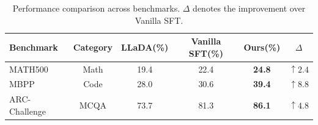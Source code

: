 \begin{table}[htbp]
\centering
\small
\caption{
Performance comparison across benchmarks. $\Delta$ denotes the improvement over Vanilla SFT.
}
\begin{tabular}{lccccc}
\toprule
Benchmark & Category & LLaDA(\%) & Vanilla SFT(\%) & Ours(\%) & $\Delta$ \\
\midrule
MATH500 & Math & 19.4 & 22.4 & \textbf{24.8} & $\uparrow 2.4$ \\
MBPP & Code & 28.0 & 30.6 & \textbf{39.4} & $\uparrow 8.8$ \\
ARC-Challenge & MCQA & 73.7 & 81.3 & \textbf{86.1} & $\uparrow 4.8$ \\
\bottomrule
\end{tabular}

\label{tab:textgen-main}
\end{table}